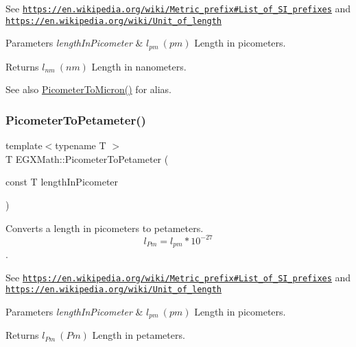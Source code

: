 See \href{https://en.wikipedia.org/wiki/Metric_prefix#List_of_SI_prefixes}{\tt https\+://en.\+wikipedia.\+org/wiki/\+Metric\+\_\+prefix\#\+List\+\_\+of\+\_\+\+S\+I\+\_\+prefixes} and \href{https://en.wikipedia.org/wiki/Unit_of_length}{\tt https\+://en.\+wikipedia.\+org/wiki/\+Unit\+\_\+of\+\_\+length} 
\begin{DoxyParams}{Parameters}
{\em length\+In\+Picometer} & $ l_{pm}\ (pm)$ Length in picometers. \\
\hline
\end{DoxyParams}
\begin{DoxyReturn}{Returns}
$ l_{nm}\ (nm)$ Length in nanometers. 
\end{DoxyReturn}
\begin{DoxySeeAlso}{See also}
\mbox{\hyperlink{group___e_g_x_math-_conversions-_length_conversions-_s_i-_picometer-_non-_s_i_gad8fddabe74b111596888c370081f725e}{Picometer\+To\+Micron()}} for alias. 
\end{DoxySeeAlso}
\mbox{\label{group___e_g_x_math-_conversions-_length_conversions-_s_i-_picometer-_s_i_ga491c4ac277c5b63710e9d11aa4b1ecc4}} 
\subsubsection{\texorpdfstring{Picometer\+To\+Petameter()}{PicometerToPetameter()}}
{\footnotesize\ttfamily template$<$typename T $>$ \\
T E\+G\+X\+Math\+::\+Picometer\+To\+Petameter (\begin{DoxyParamCaption}\item[{const T}]{length\+In\+Picometer }\end{DoxyParamCaption})}



Converts a length in picometers to petameters. \[ l_{Pm}=l_{pm} * 10^{-27} \]. 

See \href{https://en.wikipedia.org/wiki/Metric_prefix#List_of_SI_prefixes}{\tt https\+://en.\+wikipedia.\+org/wiki/\+Metric\+\_\+prefix\#\+List\+\_\+of\+\_\+\+S\+I\+\_\+prefixes} and \href{https://en.wikipedia.org/wiki/Unit_of_length}{\tt https\+://en.\+wikipedia.\+org/wiki/\+Unit\+\_\+of\+\_\+length} 
\begin{DoxyParams}{Parameters}
{\em length\+In\+Picometer} & $ l_{pm}\ (pm)$ Length in picometers. \\
\hline
\end{DoxyParams}
\begin{DoxyReturn}{Returns}
$ l_{Pm}\ (Pm)$ Length in petameters. 
\end{DoxyReturn}
\mbox{\label{group___e_g_x_math-_conversions-_length_conversions-_s_i-_picometer-_s_i_ga208383d9423614bbd8ddf3731114e31e}} 
